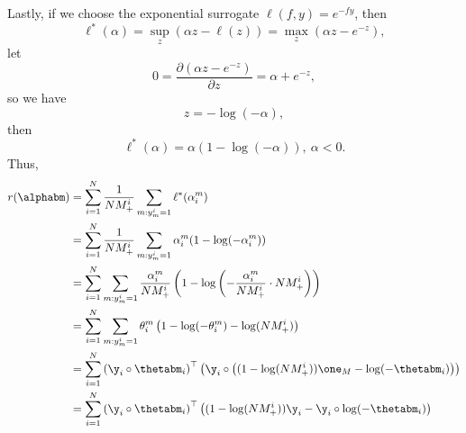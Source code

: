 Lastly, if we choose the exponential surrogate $\ell(f, y) = e^{-fy}$, then
\begin{equation*}
\ell^*(\alpha) = \sup_z \left(\alpha z - \ell(z) \right) = \max_z \left(\alpha z - e^{-z} \right),
\end{equation*}
let 
\begin{equation*}
0 = \frac{\partial (\alpha z - e^{-z})}{\partial z} = \alpha + e^{-z},
\end{equation*}
so we have
\begin{equation*}
z = -\log(-\alpha),
\end{equation*}
then
\begin{equation*}
\ell^*(\alpha) = \alpha ( 1 - \log(-\alpha) ), \ \alpha < 0.
\end{equation*}
Thus,
\begin{equation}
\label{eq:expconj}
\begin{aligned}
r(\alphabm)
&= \sum_{i=1}^N \frac{1}{N M_+^i} \sum_{m: y_m^i = 1} \ell^*(\alpha_i^m) \\
&= \sum_{i=1}^N \frac{1}{N M_+^i} \sum_{m: y_m^i = 1} \alpha_i^m (1 - \log(-\alpha_i^m)) \\
&= \sum_{i=1}^N \sum_{m: y_m^i = 1} \frac{\alpha_i^m}{N M_+^i} \left(1 - \log \left( -\frac{\alpha_i^m}{N M_+^i} \cdot N M_+^i \right) \right) \\
&= \sum_{i=1}^N \sum_{m: y_m^i = 1} \theta_i^m \left(1 - \log(-\theta_i^m) - \log(N M_+^i) \right) \\
&= \sum_{i=1}^N \left( \y_i \circ \thetabm_i \right)^\top 
                \left( \y_i \circ \left( (1 - \log(N M_+^i)) \one_M - \log(-\thetabm_i) \right) \right) \\
&= \sum_{i=1}^N \left( \y_i \circ \thetabm_i \right)^\top 
                \left( (1 - \log(N M_+^i)) \y_i - \y_i \circ \log(-\thetabm_i) \right)
\end{aligned}
\end{equation}

